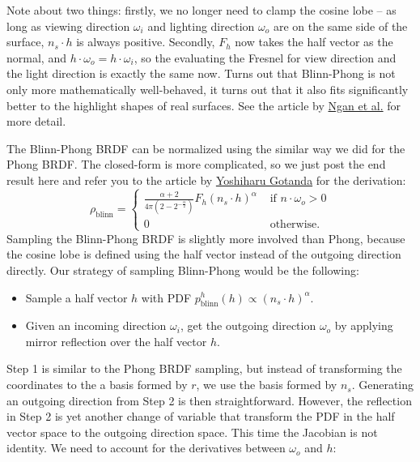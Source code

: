 Note about two things: firstly, we no longer need to clamp the cosine lobe -- as long as viewing direction $\omega_i$ and lighting direction $\omega_o$ are on the same side of the surface, $n_s \cdot h$ is always positive. Secondly, $F_h$ now takes the half vector as the normal, and $h \cdot \omega_o = h \cdot \omega_i$, so the evaluating the Fresnel for view direction and the light direction is exactly the same now. 
Turns out that Blinn-Phong is not only more mathematically well-behaved, it turns out that it also fits significantly better to the highlight shapes of real surfaces. See the article by \href{http://people.csail.mit.edu/addy/research/brdf/index.html}{Ngan et al.} for more detail.

The Blinn-Phong BRDF can be normalized using the similar way we did for the Phong BRDF. The closed-form is more complicated, so we just post the end result here and refer you to the article by \href{https://renderwonk.com/publications/s2010-shading-course/gotanda/course_note_practical_implementation_at_triace.pdf}{Yoshiharu Gotanda} for the derivation:
\begin{equation}
\rho_{\text{blinn}} = \begin{cases}
\frac{\alpha + 2}{4\pi\left(2 - 2^{-\frac{\alpha}{2}}\right)} F_h \left(n_s \cdot h\right)^{\alpha} & \text{ if } n \cdot \omega_o > 0 \\
0 & \text{ otherwise.} 
\end{cases}
\end{equation}
Sampling the Blinn-Phong BRDF is slightly more involved than Phong, because the cosine lobe is defined using the half vector instead of the outgoing direction directly. Our strategy of sampling Blinn-Phong would be the following:
\begin{itemize}
  \item Sample a half vector $h$ with PDF $p_{\text{blinn}}^h(h) \propto \left(n_s \cdot h\right)^{\alpha}$.
  \item Given an incoming direction $\omega_i$, get the outgoing direction $\omega_o$ by applying mirror reflection over the half vector $h$. 
\end{itemize}
Step 1 is similar to the Phong BRDF sampling, but instead of transforming the coordinates to the a basis formed by $r$, we use the basis formed by $n_s$. Generating an outgoing direction from Step 2 is then straightforward. However, the reflection in Step 2 is yet another change of variable that transform the PDF in the half vector space to the outgoing direction space. This time the Jacobian is not identity. We need to account for the derivatives between $\omega_o$ and $h$:
